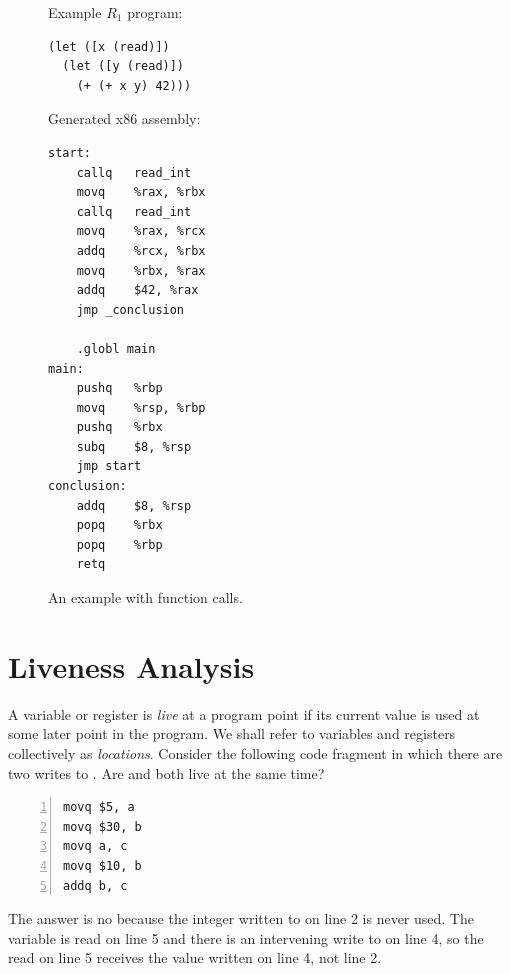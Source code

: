 \documentclass[11pt]{book}
\begin{document}
\begin{figure}[tp]
\begin{minipage}{0.45\textwidth}
Example $R_1$ program:
\begin{lstlisting}
(let ([x (read)])
  (let ([y (read)])
    (+ (+ x y) 42)))
\end{lstlisting}
\end{minipage}
\begin{minipage}{0.45\textwidth}
Generated x86 assembly:
\begin{lstlisting}
start:
	callq	read_int
	movq	%rax, %rbx
	callq	read_int
	movq	%rax, %rcx
	addq	%rcx, %rbx
	movq	%rbx, %rax
	addq	$42, %rax
	jmp _conclusion

	.globl main
main:
	pushq	%rbp
	movq	%rsp, %rbp
	pushq	%rbx
	subq	$8, %rsp
	jmp start
conclusion:
	addq	$8, %rsp
	popq	%rbx
	popq	%rbp
	retq
\end{lstlisting}
\end{minipage}
\caption{An example with function calls.}
  \label{fig:example-calling-conventions}
\end{figure}

\clearpage

\section{Liveness Analysis}
\label{sec:liveness-analysis-r1}

A variable or register is \emph{live} at a program point if its
current value is used at some later point in the program.  We shall
refer to variables and registers collectively as \emph{locations}.
%
Consider the following code fragment in which there are two writes to
. Are  and  both live at the same time?
\begin{lstlisting}[numbers=left,numberstyle=\tiny]
movq $5, a
movq $30, b
movq a, c
movq $10, b
addq b, c
\end{lstlisting}
The answer is no because the integer  written to  on
line 2 is never used. The variable  is read on line 5 and
there is an intervening write to  on line 4, so the read on
line 5 receives the value written on line 4, not line 2.
\end{document}
